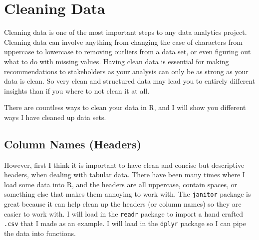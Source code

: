 \documentclass[
  letterpaper,
  DIV=11,
  numbers=noendperiod]{scrreprt}
\author{}
\date{}
\begin{document}
\ifdefined\Shaded\renewenvironment{Shaded}{\begin{tcolorbox}[interior hidden, enhanced, borderline west={3pt}{0pt}{shadecolor}, sharp corners, frame hidden, breakable, boxrule=0pt]}{\end{tcolorbox}}\fi

\hypertarget{cleaning-data}{%
\chapter{Cleaning Data}\label{cleaning-data}}

Cleaning data is one of the most important steps to any data analytics
project. Cleaning data can involve anything from changing the case of
characters from uppercase to lowercase to removing outliers from a data
set, or even figuring out what to do with missing values. Having clean
data is essential for making recommendations to stakeholders as your
analysis can only be as strong as your data is clean. So very clean and
structured data may lead you to entirely different insights than if you
where to not clean it at all.

There are countless ways to clean your data in R, and I will show you
different ways I have cleaned up data sets.

\hypertarget{column-names-headers}{%
\section{Column Names (Headers)}\label{column-names-headers}}

However, first I think it is important to have clean and concise but
descriptive headers, when dealing with tabular data. There have been
many times where I load some data into R, and the headers are all
uppercase, contain spaces, or something else that makes them annoying to
work with. The \texttt{janitor} package is great because it can help
clean up the headers (or column names) so they are easier to work with.
I will load in the \texttt{readr} package to import a hand crafted
\texttt{.csv} that I made as an example. I will load in the
\texttt{dplyr} package so I can pipe the data into functions.
\end{document}
